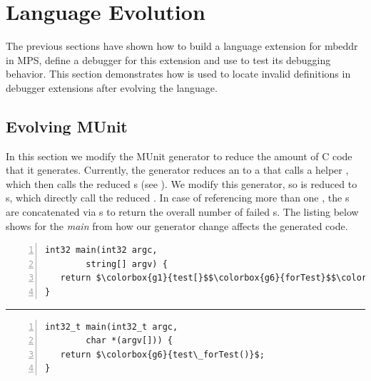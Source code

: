 \section{Language Evolution}

The previous sections have shown how to build a language extension for mbeddr in
\ac{MPS}, define a debugger for this extension and use  to test its
debugging behavior.
This section demonstrates how  is used to locate invalid definitions
in debugger extensions after evolving the language.

\subsection{Evolving MUnit}

In this section we modify the MUnit generator to reduce the amount of C
code that it generates. Currently, the generator reduces an
 to a  that calls a helper
, which then calls the reduced s (see ).
We modify this generator, so  is reduced to
s, which directly call the reduced . In case of
referencing more than one , the s are concatenated
via s to return the overall number of failed
s. The listing below shows for the \emph{main} 
from  how our generator change affects the generated code. 

\vspace{-2mm}
\noindent 
\hspace{1.2mm}
\begin{minipage}[t]{120pt} 
\begin{lstlisting}[language=reducedMbeddr,numbers=left]
int32 main(int32 argc,
		string[] argv) {
   return $\colorbox{g1}{test[}$$\colorbox{g6}{forTest}$$\colorbox{g1}{]}$;
}
\end{lstlisting}
\end{minipage} 
\rule[-10ex]{0.1ex}{4.0em}
\hspace{0.75mm}
\begin{minipage}[t]{125pt} 
\begin{lstlisting}[language=reducedMbeddr,numbers=left]
int32_t main(int32_t argc,
		char *(argv[])) {
   return $\colorbox{g6}{test\_forTest()}$;
}  
\end{lstlisting}
\end{minipage} 
\vspace{-4mm}
\begin{lstlisting}[caption={Parts of the example program
from \lst{lst:generatedUT} using \emph{MUnit} on the left and the C code
generated from it with our modified generator},
language=mbeddr,label=lst:newGeneratedUT]
\end{lstlisting}


